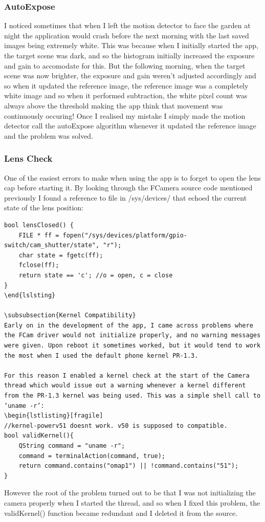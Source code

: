 \subsubsection{AutoExpose}
I noticed sometimes that when I left the motion detector to face the garden at night the application would crash before the next morning with the last saved images being extremely white. This was because when I initially started the app, the target scene was dark, and so the histogram initially increased the exposure and gain to accomodate for this. But the following morning, when the target scene was now brighter, the exposure and gain weren’t adjusted accordingly and so when it updated the reference image, the reference image was a completely white image and so when it performed subtraction, the white pixel count was always above the threshold making the app think that movement was continuously occuring!
Once I realised my mistake I simply made the motion detector call the autoExpose algorithm whenever it updated the reference image and the problem was solved.

\subsubsection{Lens Check}
One of the easiest errors to make when using the app is to forget to open the lens cap before starting it. By looking through the FCamera source code mentioned previously I found a reference to file in /sys/devices/ that echoed the current state of the lens position:
\begin{lstlisting}[fragile]
bool lensClosed() {
    FILE * ff = fopen("/sys/devices/platform/gpio-switch/cam_shutter/state", "r");
    char state = fgetc(ff);
    fclose(ff);
    return state == 'c'; //o = open, c = close
}
\end{lslsting}

\subsubsection{Kernel Compatibility}
Early on in the development of the app, I came across problems where the FCam driver would not initialize properly, and no warning messages were given. Upon reboot it sometimes worked, but it would tend to work the most when I used the default phone kernel PR-1.3.

For this reason I enabled a kernel check at the start of the Camera thread which would issue out a warning whenever a kernel different from the PR-1.3 kernel was being used. This was a simple shell call to ‘uname -r’:
\begin{lstlisting}[fragile]
//kernel-powerv51 doesnt work. v50 is supposed to compatible.
bool validKernel(){
    QString command = "uname -r";
    command = terminalAction(command, true);
    return command.contains("omap1") || !command.contains("51");
}
\end{lstlisting}
 However the root of the problem turned out to be that I was not initializing the camera properly when I started the thread, and so when I fixed this problem, the validKernel() function became redundant and I deleted it from the source.


%
%
%
%
%